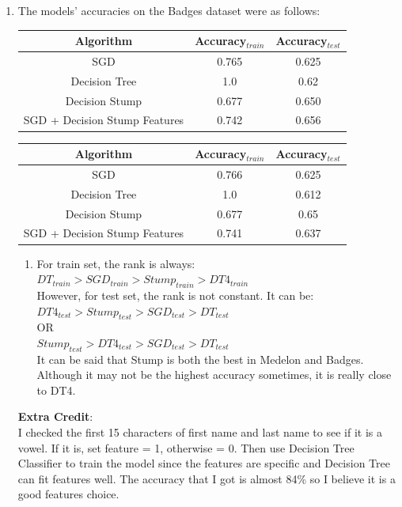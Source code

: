 \documentclass{article}
\begin{document}
\begin{enumerate}
\begin{enumerate}
            \item %
            The models' accuracies on the Badges dataset were as follows:
            \begin{center}
                \begin{tabular}{|c|c|c|}
                    \hline Algorithm & Accuracy$_{train}$ & Accuracy$_{test}$ \\
                    \hline SGD & 0.765 & 0.625 \\
                    Decision Tree & 1.0 & 0.62 \\
                    Decision Stump & 0.677 & 0.650 \\
                    SGD + Decision Stump Features & 0.742 & 0.656 \\ \hline
                \end{tabular}
                 \begin{tabular}{|c|c|c|}
                    \hline Algorithm & Accuracy$_{train}$ & Accuracy$_{test}$ \\
                    \hline SGD & 0.766 & 0.625 \\
                    Decision Tree & 1.0 & 0.612 \\
                    Decision Stump & 0.677 & 0.65 \\
                    SGD + Decision Stump Features & 0.741 & 0.637 \\ \hline
                \end{tabular}
            \end{center}

            \begin{enumerate}[1.]
                \item 
                For train set, the rank is always:\\
                $DT_{train} > SGD_{train} > Stump_{train} > DT4_{train}$\\
                However, for test set, the rank is not constant. It can be: 
                $DT4_{test} > Stump_{test} > SGD_{test} > DT_{test}$\\
                OR\\
                $Stump_{test} > DT4_{test} > SGD_{test} > DT_{test}$\\
                It can be said that Stump is both the best in Medelon and Badges. Although it may not be the highest accuracy sometimes, it is really close to DT4.
            \end{enumerate}

            \textbf{Extra Credit}:\\
             I checked the first 15 characters of first name and last name to see if it is a vowel. If it is, set feature = 1, otherwise = 0. Then use Decision Tree Classifier to train the model
             since the features are specific and Decision Tree can fit features well. The accuracy that I got is almost 84\% so I believe it is a good features choice.
             
        \end{enumerate}
    \end{enumerate}
\end{document}
